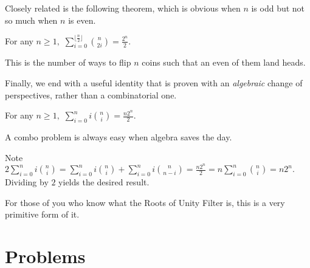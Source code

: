 \documentclass[blue,onecol]{shooting}
\begin{document}
Closely related is the following theorem, which is obvious when $n$ is odd but not so much when $n$ is even.

\begin{exam}
For any $n\geq 1,$ $\sum\limits_{i=0}^{\lfloor\frac{n}{2}\rfloor}\binom{n}{2i}=\frac{2^n}{2}.$
\end{exam}

\begin{sol}
This is the number of ways to flip $n$ coins such that an even of them land heads.
\end{sol}

Finally, we end with a useful identity that is proven with an \textit{algebraic} change of perspectives, rather than a combinatorial one.

\begin{exam}
For any $n\geq 1,$ $\sum\limits_{i=0}^{n}i\binom{n}{i}=\frac{n2^n}{2}.$
\end{exam}

\begin{sol}
A combo problem is always easy when algebra saves the day.

Note $2\sum\limits_{i=0}^{n}i\binom{n}{i}=\sum\limits_{i=0}^{n}i\binom{n}{i}+\sum\limits_{i=0}^{n}i\binom{n}{n-i}=\frac{n2^n}{2}=n\sum\limits_{i=0}^{n}\binom{n}{i}=n2^n.$ Dividing by $2$ yields the desired result.
\end{sol}

For those of you who know what the Roots of Unity Filter is, this is a very primitive form of it.














\pagebreak

\section{Problems}


\end{document}

